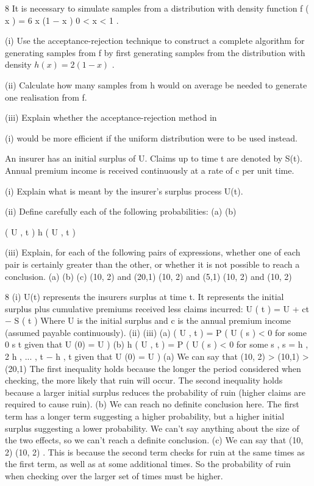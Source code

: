 

8
It is necessary to simulate samples from a distribution with density function f ( x ) = 6 x (1 − x ) 0 < x < 1 .
\item (i)  Use the acceptance-rejection technique to construct a complete algorithm for generating samples from f by first generating samples from the distribution
with density $h ( x ) = 2(1 − x )$ .

\item (ii)  Calculate how many samples from h would on average be needed to generate one realisation from f.

\item (iii)  Explain whether the acceptance-rejection method in \item (i)  would be more efficient if the uniform distribution were to be used instead.

An insurer has an initial surplus of U. Claims up to time t are denoted by S(t).
Annual premium income is received continuously at a rate of c per unit time.
\item (i)  Explain what is meant by the insurer’s surplus process U(t).
\item (ii)  Define carefully each of the following probabilities:
(a)
(b)

\psi  ( U , t )
\psi  h ( U , t )

\item (iii) 
Explain, for each of the following pairs of expressions, whether one of each
pair is certainly greater than the other, or whether it is not possible to reach a
conclusion.
(a)
(b)
(c)
\psi  (10, 2) and \psi  (20,1)
\psi  (10, 2) and \psi  (5,1)
 (10, 2) and  (10, 2)


8
(i)
U(t) represents the insurers surplus at time t. It represents the initial surplus
plus cumulative premiums received less claims incurred:
U ( t ) = U + ct − S ( t )
Where U is the initial surplus and c is the annual premium income (assumed
payable continuously).
(ii)
(iii)
(a) \psi  ( U , t ) = P ( U ( s ) < 0 for some 0 \leq  s \leq  t given that U (0) = U )
(b) \psi  h ( U , t ) = P ( U ( s ) < 0 for some s , s = h , 2 h , ... , t − h , t
given that U (0) = U )
(a) We can say that \psi  (10, 2) > \psi  (10,1) > \psi  (20,1)
The first inequality holds because the longer the period considered
when checking, the more likely that ruin will occur. The second
inequality holds because a larger initial surplus reduces the probability
of ruin (higher claims are required to cause ruin).
(b) We can reach no definite conclusion here. The first term has a longer
term suggesting a higher probability, but a higher initial surplus
suggesting a lower probability. We can’t say anything about the size
of the two effects, so we can’t reach a definite conclusion.
(c) We can say that  (10, 2) \leq  {} (10, 2) .
This is because the second term checks for ruin at the same times as the first
term, as well as at some additional times. So the probability of ruin when
checking over the larger set of times must be higher.
